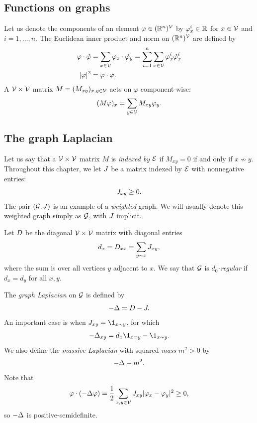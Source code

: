 \subsection{Functions on graphs}

Let us denote the components of an element $\varphi \in ({\mathbb R}^n)^{\mathcal{V}}$ by
$\varphi^i_x \in {\mathbb R}$ for $x \in \mathcal{V}$ and $i = 1, \ldots, n$.
The Euclidean inner product and norm on $({\mathbb R}^n)^{\mathcal{V}}$
are defined by
\begin{align}
\varphi\cdot\tilde\varphi
	&= \sum_{x\in\mathcal{V}} \varphi_x \cdot \tilde\varphi_y
  		= \sum_{i=1}^n \sum_{x\in\mathcal{V}} \varphi^i_x \tilde\varphi^i_x \\
|\varphi|^2
	&= \varphi \cdot \varphi.
\end{align}
A $\mathcal{V}\times\mathcal{V}$ matrix $M = (M_{xy})_{x,y\in\mathcal{V}}$ acts on $\varphi$
component-wise:
\begin{equation}
(M \varphi)_x = \sum_{y\in\mathcal{V}} M_{xy} \varphi_y.
\end{equation}


\subsection{The graph Laplacian}

Let us say that a $\mathcal{V}\times\mathcal{V}$ matrix $M$ is \emph{indexed by} $\mathcal{E}$
if $M_{xy} = 0$ if and only if $x \not\sim y$.
Throughout this chapter, we let $J$ be a matrix indexed by $\mathcal{E}$ with nonnegative entries:
\begin{equation}
J_{xy} \ge 0.
\end{equation}
The pair $(\mathcal{G}, J)$ is an example of a \emph{weighted} graph.
We will usually denote this weighted graph simply as $\mathcal{G}$, with $J$
implicit.

Let $D$ be the diagonal $\mathcal{V}\times\mathcal{V}$ matrix with diagonal entries
\begin{equation}
d_x = D_{xx} = \sum_{y \sim x} J_{xy},
\end{equation}
where the sum is over all vertices $y$ adjacent to $x$.
We say that $\mathcal{G}$ is \emph{$d_0$-regular} if $d_x = d_y$ for all $x, y$.

The \emph{graph Laplacian} on $\mathcal{G}$ is defined by
\begin{equation}
-\Delta = D - J.
\end{equation}
An important case is when $\jay_{xy} = \1_{x\sim y}$, for which
\begin{equation}
\label{e:Deltaxy}
-\Delta_{xy} = d_x \1_{x=y} - \1_{x \sim y}.
\end{equation}
We also define the \emph{massive Laplacian} with squared \emph{mass} $m^2 > 0$ by
\begin{equation}
-\Delta + m^2.
\end{equation}
Note that
\begin{equation}
\label{e:sbp-gen}
\varphi \cdot (-\Delta \varphi)
  =
\frac{1}{2} \sum_{x,y\in\mathcal{V}} J_{xy} |\varphi_x - \varphi_y|^2
  \ge
0,
\end{equation}
so $-\Delta$ is positive-semidefinite.

